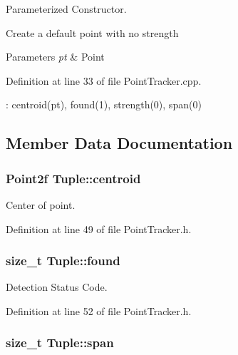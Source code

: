 \-Parameterized \-Constructor. 

\-Create a default point with no strength 
\begin{DoxyParams}{\-Parameters}
{\em pt} & \-Point \\
\hline
\end{DoxyParams}


\-Definition at line 33 of file \-Point\-Tracker.\-cpp.


\begin{DoxyCode}
                              : centroid(pt), found(1), strength(0), span(0){
    
}
\end{DoxyCode}


\subsection{\-Member \-Data \-Documentation}
\hypertarget{class_tuple_ab3df7dd8c3da6e5d69e20492adcfb1ee}{
\subsubsection[{centroid}]{\setlength{\rightskip}{0pt plus 5cm}\-Point2f {\bf \-Tuple\-::centroid}}}
\label{class_tuple_ab3df7dd8c3da6e5d69e20492adcfb1ee}


\-Center of point. 



\-Definition at line 49 of file \-Point\-Tracker.\-h.

\hypertarget{class_tuple_a29532869144a5cfc2b2eb935d91edcd9}{
\subsubsection[{found}]{\setlength{\rightskip}{0pt plus 5cm}size\-\_\-t {\bf \-Tuple\-::found}}}
\label{class_tuple_a29532869144a5cfc2b2eb935d91edcd9}


\-Detection \-Status \-Code. 



\-Definition at line 52 of file \-Point\-Tracker.\-h.

\hypertarget{class_tuple_ae321f88dc0b67f9e0f89e51b25db02c5}{
\subsubsection[{span}]{\setlength{\rightskip}{0pt plus 5cm}size\-\_\-t {\bf \-Tuple\-::span}}}
\label{class_tuple_ae321f88dc0b67f9e0f89e51b25db02c5}


